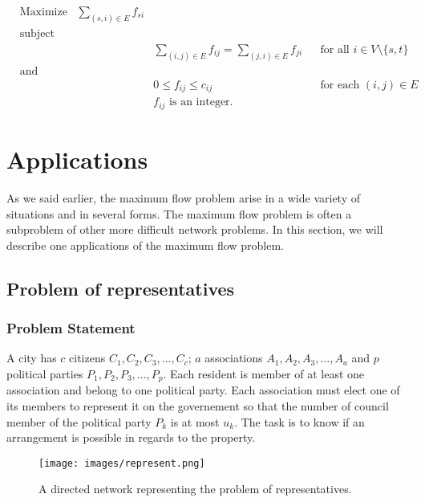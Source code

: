\begin{equation}
\begin{aligned}
& {\text{Maximize}} & \sum\limits_{(s,i) \in E} f_{si} & & &\\
& \text{subject to} & & & &\\
& & & \sum\limits_{(i,j)\in E} f_{ij} = \sum\limits_{(j,i)\in E} f_{ji} & & \text{for all } i \in V \setminus \{s, t\}\\
& \text{and} & & & & \\
& & & 0 \leq f_{ij} \leq c_{ij} & & \text{for each } (i, j) \in E\\
& & & f_{ij} \text{ is an integer.}& &
\end{aligned}
\end{equation}

\section{Applications}
\label{sec:applications}
As we said earlier, the maximum flow problem arise in a wide variety of situations and in several forms. The maximum flow problem is often a subproblem of other more difficult network problems. In this section, we will describe one applications of the maximum flow problem.

\subsection{Problem of representatives}

\subsubsection{Problem Statement}

A city has $c$ citizens $C_1, C_2, C_3, ..., C_c$; $a$ associations $A_1, A_2, A_3, ..., A_a$ and $p$ political parties $P_1, P_2, P_3, ..., P_p$. Each resident is member of at least one association and belong to one political party. Each association  must elect one of its members to represent it on the governement so that the number of council member of the political party $P_k$ is at most $u_k$. The task is to know if an arrangement is possible in regards to the property.

\begin{figure}[H]
\centering
\texttt{[image: images/represent.png]}
\caption{A directed network representing the problem of representatives.}
\label{img:represent}
\end{figure}

